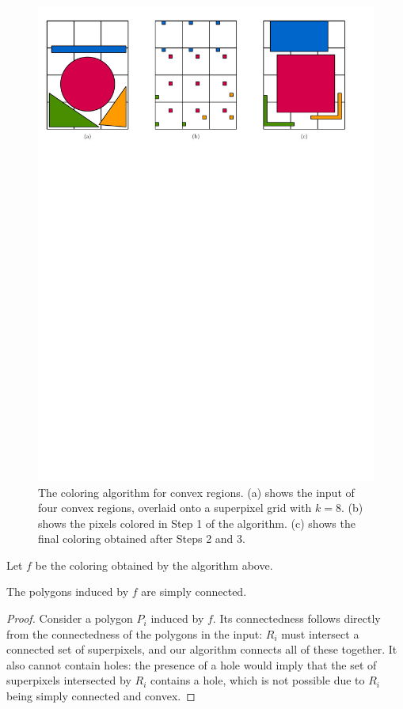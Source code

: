 \documentclass[a4paper,UKenglish,cleveref]{lipics-v2019}
\begin{document}
\begin{figure}
\centering
\includegraphics[width=\textwidth]{Figures/convexprojection.pdf}
\caption{The coloring algorithm for convex regions. (a) shows the input of four convex regions, overlaid onto a superpixel grid with \(k = 8\). (b) shows the pixels colored in Step 1 of the algorithm. (c) shows the final coloring obtained after Steps 2 and 3.}
\label{fig:convexprojection}
\end{figure}

Let \(f\) be the coloring obtained by the algorithm above.

\begin{lemma}\label{lem:convex-simply-connected}
	The polygons induced by \(f\) are simply connected.
\end{lemma}
\begin{proof}
	Consider a polygon \(P_i\) induced by \(f\). Its connectedness follows directly from the connectedness of the polygons in the input: \(R_i\) must intersect a connected set of superpixels, and our algorithm connects all of these together. It also cannot contain holes: the presence of a hole would imply that the set of superpixels intersected by \(R_i\) contains a hole, which is not possible due to \(R_i\) being simply connected and convex.
\end{proof}
\end{document}
